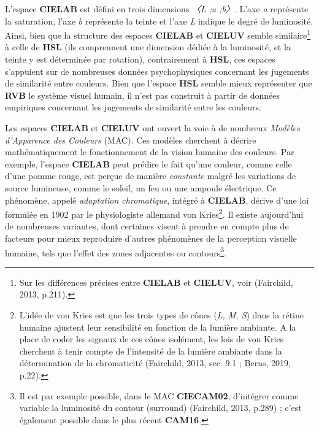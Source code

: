 \documentclass{article}
\begin{document}
L'espace \textbf{CIELAB} est défini en trois dimensions \textit{〈L ;a ;b〉}. L'axe \textit{a} représente la saturation, l'axe \textit{b} représente la teinte et l'axe \textit{L} indique le degré de luminosité. Ainsi, bien que la structure des espaces \textbf{CIELAB} et \textbf{CIELUV} semble similaire\footnote{Sur les différences précises entre \textbf{CIELAB} et \textbf{CIELUV}, voir (Fairchild, 2013, p.211).} à celle de \textbf{HSL} (ils comprennent une dimension dédiée à la luminosité, et la teinte y est déterminée par rotation), contrairement à \textbf{HSL}, ces espaces s’appuient sur de nombreuses données psychophysiques concernant les jugements de similarité entre couleurs. Bien que l’espace \textbf{HSL} semble mieux représenter que \textbf{RVB} le système visuel humain, il n’est pas construit à partir de données empiriques concernant les jugements de similarité entre les couleurs.
\par
Les espaces \textbf{CIELAB} et \textbf{CIELUV} ont ouvert la voie à de nombreux \textit{Modèles d’Apparence des Couleurs} (MAC). Ces modèles cherchent à décrire mathématiquement le fonctionnement de la vision humaine des couleurs. Par exemple, l’espace \textbf{CIELAB} peut prédire le fait qu'une couleur, comme celle d'une pomme rouge, est perçue de manière \textit{constante} malgré les variations de source lumineuse, comme le soleil, un feu ou une ampoule électrique. Ce phénomène, appelé \textit{adaptation chromatique}, intégré à \textbf{CIELAB}, dérive d’une loi formulée en 1902 par le physiologiste allemand von Kries\footnote{L’idée de von Kries est que les trois types de cônes (\textit{L, M, S}) dans la rétine humaine ajustent leur sensibilité en fonction de la lumière ambiante. A la place de coder les signaux de ces cônes isolément, les lois de von Kries cherchent à tenir compte de l’intensité de la lumière ambiante dans la détermination de la chromaticité (Fairchild, 2013, sec. 9.1 ; Berns, 2019, p.22).}. Il existe aujourd’hui de nombreuses variantes, dont certaines visent à prendre en compte plus de facteurs pour mieux reproduire d’autres phénomènes de la perception visuelle humaine, tels que l’effet des zones adjacentes ou contours\footnote{Il est par exemple possible, dans le MAC \textbf{CIECAM02}, d’intégrer comme variable la luminosité du contour (surround) (Fairchild, 2013, p.289) ; c’est également possible dans le plus récent \textbf{CAM16}. }.
\par
\end{document}
